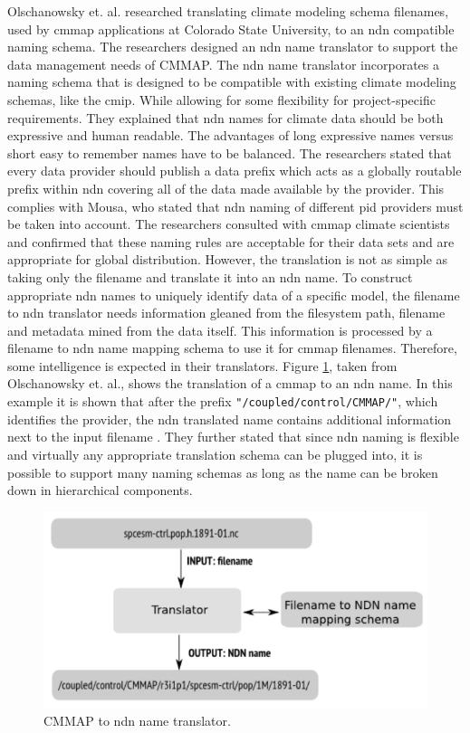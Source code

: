 Olschanowsky et. al. researched translating climate modeling schema filenames, used by \gls{cmmap} applications at Colorado State University, to an \gls{ndn} compatible 
naming schema. The researchers designed an \gls{ndn} name translator to support the data management needs of CMMAP. The \gls{ndn} name translator incorporates a naming schema that is designed to be compatible with existing climate modeling schemas, like the \gls{cmip}. While allowing for some flexibility for project-specific requirements. They explained that \gls{ndn} names for climate data should be both expressive and human readable. The advantages of long expressive names versus short easy to remember names have to be balanced.
The researchers stated that every data provider should publish a data prefix which acts as a globally
routable prefix within \gls{ndn} covering all of the data made available by the provider. This complies with Mousa, who stated that \gls{ndn} naming of different \gls{pid} providers must be taken into account. The researchers consulted with \gls{cmmap} climate scientists and confirmed that these naming rules are acceptable for their data sets and are appropriate for global distribution. 
However, the translation is not as simple as taking only the filename and translate it into an \gls{ndn} name. To construct appropriate \gls{ndn} names to uniquely identify data of a specific model, the filename to \gls{ndn} translator needs information gleaned from the filesystem path, filename and metadata mined from the data itself. This information is processed by a filename to \gls{ndn} name mapping schema to use it for \gls{cmmap} filenames. Therefore, some intelligence is expected in their translators.
Figure \ref{fig:cmmap_ndnn}, taken from Olschanowsky et. al., shows the translation of a \gls{cmmap} to an \gls{ndn} name. In this example it is shown that after the prefix \texttt{"/coupled/control/CMMAP/"}, which identifies the provider, the \gls{ndn} translated name contains additional information next to the input filename \cite{ndn-clim}.
They further stated that since \gls{ndn} naming is flexible and virtually any appropriate translation schema can be plugged into, it is possible to support many naming schemas as long as the name can be broken down in hierarchical components.

\begin{figure}[H]
\centering
\includegraphics[scale=0.4]{Images/cmip2ndn.png}
\caption{CMMAP to \gls{ndn} name translator.}
\label{fig:cmmap_ndnn}
\end{figure}

